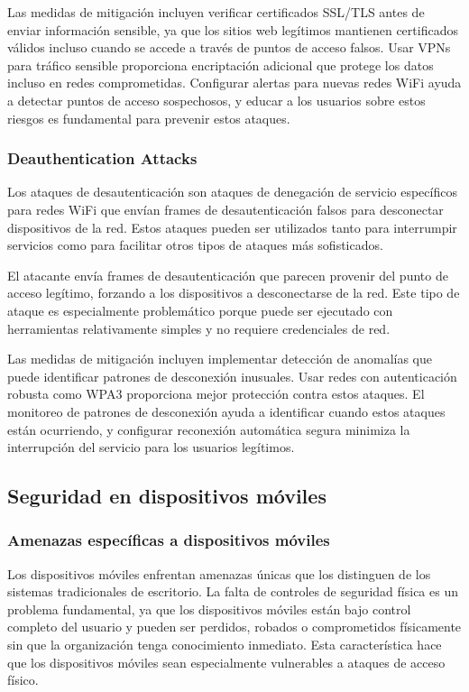 Las medidas de mitigación incluyen verificar certificados SSL/TLS antes de enviar información sensible, ya que los sitios web legítimos mantienen certificados válidos incluso cuando se accede a través de puntos de acceso falsos. Usar VPNs para tráfico sensible proporciona encriptación adicional que protege los datos incluso en redes comprometidas. Configurar alertas para nuevas redes WiFi ayuda a detectar puntos de acceso sospechosos, y educar a los usuarios sobre estos riesgos es fundamental para prevenir estos ataques.

\subsubsection{Deauthentication Attacks}

Los ataques de desautenticación son ataques de denegación de servicio específicos para redes WiFi que envían frames de desautenticación falsos para desconectar dispositivos de la red. Estos ataques pueden ser utilizados tanto para interrumpir servicios como para facilitar otros tipos de ataques más sofisticados.

El atacante envía frames de desautenticación que parecen provenir del punto de acceso legítimo, forzando a los dispositivos a desconectarse de la red. Este tipo de ataque es especialmente problemático porque puede ser ejecutado con herramientas relativamente simples y no requiere credenciales de red.

Las medidas de mitigación incluyen implementar detección de anomalías que puede identificar patrones de desconexión inusuales. Usar redes con autenticación robusta como WPA3 proporciona mejor protección contra estos ataques. El monitoreo de patrones de desconexión ayuda a identificar cuando estos ataques están ocurriendo, y configurar reconexión automática segura minimiza la interrupción del servicio para los usuarios legítimos.

\subsection{Seguridad en dispositivos móviles}

\subsubsection{Amenazas específicas a dispositivos móviles}

Los dispositivos móviles enfrentan amenazas únicas que los distinguen de los sistemas tradicionales de escritorio. La falta de controles de seguridad física es un problema fundamental, ya que los dispositivos móviles están bajo control completo del usuario y pueden ser perdidos, robados o comprometidos físicamente sin que la organización tenga conocimiento inmediato. Esta característica hace que los dispositivos móviles sean especialmente vulnerables a ataques de acceso físico.

